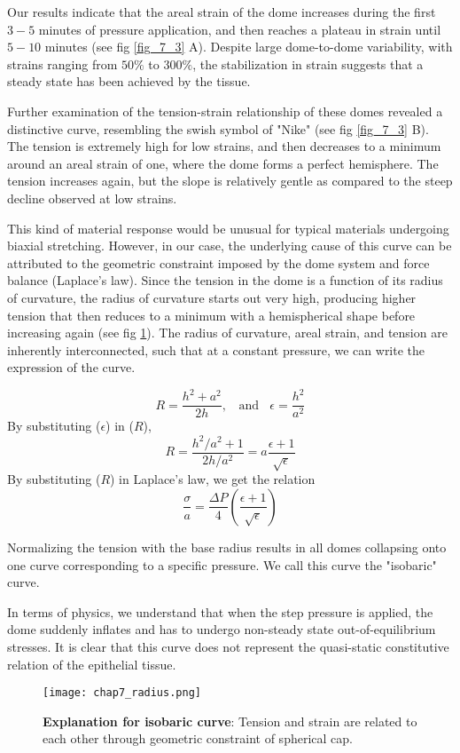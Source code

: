 Our results indicate that the areal strain of the dome increases during the first $3-5$ minutes of pressure application, and then reaches a plateau in strain until $5-10$ minutes (see fig \ref{fig_7_3} A). Despite large dome-to-dome variability, with strains ranging from $50\%$ to $300\%$, the stabilization in strain suggests that a steady state has been achieved by the tissue.

Further examination of the tension-strain relationship of these domes revealed a distinctive curve, resembling the swish symbol of "Nike" (see fig \ref{fig_7_3} B). The tension is extremely high for low strains, and then decreases to a minimum around an areal strain of one, where the dome forms a perfect hemisphere. The tension increases again, but the slope is relatively gentle as compared to the steep decline observed at low strains.

This kind of material response would be unusual for typical materials undergoing biaxial stretching. However, in our case, the underlying cause of this curve can be attributed to the geometric constraint imposed by the dome system and force balance (Laplace's law). Since the tension in the dome is a function of its radius of curvature, the radius of curvature starts out very high, producing higher tension that then reduces to a minimum with a hemispherical shape before increasing again (see fig \ref{fig_7_4}). The radius of curvature, areal strain, and tension are inherently interconnected, such that at a constant pressure, we can write the expression of the curve.

$$ R = \frac{h^2 + a^2}{2h}, \ \ \ \ \text{and} \ \ \ \ \epsilon = \frac{h^2}{a^2}$$
By substituting ($\epsilon$) in ($R$),
$$ R = \frac{h^2/a^2 + 1}{2h/a^2} = a\frac{\epsilon + 1}{\sqrt{\epsilon}}$$
By substituting ($R$) in Laplace's law, we get the relation
$$ \frac{\sigma}{a} = \frac{\Delta P}{4} \left( \frac{\epsilon + 1}{\sqrt{\epsilon}} \right)$$

Normalizing the tension with the base radius results in all domes collapsing onto one curve corresponding to a specific pressure. We call this curve the "isobaric" curve.

In terms of physics, we understand that when the step pressure is applied, the dome suddenly inflates and has to undergo non-steady state out-of-equilibrium stresses. It is clear that this curve does not represent the quasi-static constitutive relation of the epithelial tissue.

\begin{figure}
	\centering
	\texttt{[image: chap7\_radius.png]}
	\caption{\label{fig_7_4} \textbf{Explanation for isobaric curve}: Tension and strain are related to each other through geometric constraint of spherical cap.
	}
\end{figure}



